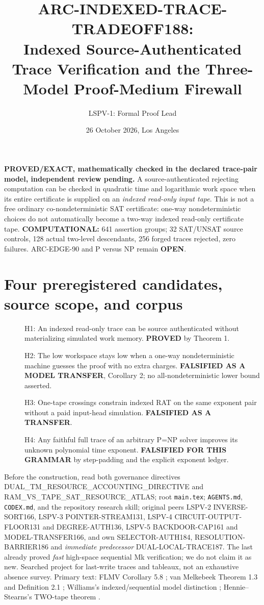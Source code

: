 \documentclass[11pt]{article}
\title{ARC-INDEXED-TRACE-TRADEOFF188:\\Indexed Source-Authenticated Trace Verification and the Three-Model Proof-Medium Firewall}
\author{LSPV-1: Formal Proof Lead}
\date{26 October 2026, Los Angeles}
\begin{document}
\maketitle
\noindent\textbf{PROVED/EXACT, mathematically checked in the declared trace-pair model, independent review pending.}
A source-authenticated rejecting computation can be checked in quadratic
time and logarithmic work space when its entire certificate is supplied
on an \emph{indexed read-only input tape}. This is not a free ordinary
co-nondeterministic SAT certificate: one-way nondeterministic choices do
not automatically become a two-way indexed read-only certificate tape.
\textbf{COMPUTATIONAL:} 641 assertion groups; 32 SAT/UNSAT source controls,
128 actual two-level descendants, 256 forged traces rejected, zero failures.
ARC-EDGE-90 and P versus NP remain \textbf{OPEN}.

\section{Four preregistered candidates, source scope, and corpus}
\begin{description}
\item[] H1: An indexed read-only trace can be source authenticated without
materializing simulated work memory. \textbf{PROVED} by Theorem 1.
\item[] H2: The low workspace stays low when a one-way nondeterministic
machine guesses the proof with no extra charges. \textbf{FALSIFIED AS A
MODEL TRANSFER}, Corollary 2; no all-nondeterministic lower bound asserted.
\item[] H3: One-tape crossings constrain indexed RAT on the same exponent
pair without a paid input-head simulation. \textbf{FALSIFIED AS A TRANSFER}.
\item[] H4: Any faithful full trace of an arbitrary P=NP solver improves its
unknown polynomial time exponent. \textbf{FALSIFIED FOR THIS GRAMMAR}
by step-padding and the explicit exponent ledger.
\end{description}
Before the construction, read both governance directives
DUAL\_TM\_RESOURCE\_ACCOUNTING\_DIRECTIVE and RAM\_VS\_TAPE\_SAT\_RESOURCE\_ATLAS;
root \texttt{main.tex}; \texttt{AGENTS.md}, \texttt{CODEX.md}, and the
repository research skill; original peers LSPV-2 INVERSE-SORT166, LSPV-3
POINTER-STREAM131, LSPV-4 CIRCUIT-OUTPUT-FLOOR131 and DEGREE-AUTH136,
LSPV-5 BACKDOOR-CAP161 and MODEL-TRANSFER166, and own SELECTOR-AUTH184,
RESOLUTION-BARRIER186 and \emph{immediate predecessor} DUAL-LOCAL-TRACE187.
The last already proved \emph{fast} high-space sequential Mk verification;
we do not claim it as new. Searched project for last-write traces and
tableaux, not an exhaustive absence survey.
Primary text: FLMV Corollary 5.8 \cite{flmv}; van Melkebeek Theorem 1.3 and
Definition 2.1 \cite{vm}; Williams's indexed/sequential model distinction
\cite{williams}; Hennie--Stearns's TWO-tape theorem \cite{hs}.
\end{document}
